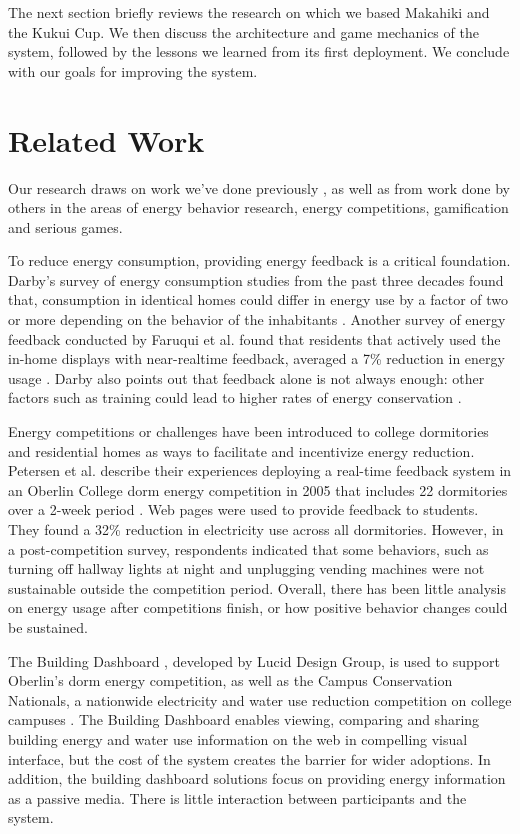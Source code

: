 \documentclass{acm_proc_article-sp}
\begin{document}
The next section briefly reviews the research on which we based Makahiki and
the Kukui Cup. We then discuss the architecture and game mechanics of the
system, followed by the lessons we learned from its first deployment. We
conclude with our goals for improving the system.

\section{Related Work}
Our research draws on work we've done previously
 \cite{csdl2-11-03,csdl2-10-07,csdl2-11-02}, as well as from
work done by others in the areas of energy behavior research, energy 
competitions, gamification and serious games. 

To reduce energy consumption, providing energy feedback is a critical
foundation. Darby's survey of energy consumption studies from the past three
decades found  that, consumption in identical homes could differ in energy use
by a factor of two or more depending on the behavior of the inhabitants
\cite{darby-review-2006}. Another survey of energy feedback conducted by
Faruqui et al. found that residents that actively used the in-home displays
with near-realtime feedback, averaged a 7\% reduction in energy usage
\cite{Faruqui09}. Darby also points out that feedback alone is not always
enough: other factors such as training could lead to higher rates of energy
conservation \cite{darby-2000-making-it-obvious}.

Energy competitions or challenges have been introduced to college dormitories
and residential homes as ways to facilitate and incentivize energy reduction.
Petersen et al. describe their experiences deploying a real-time feedback
system in an Oberlin College dorm energy competition in 2005 that includes 22
dormitories over a 2-week period \cite{petersen-dorm-energy-reduction}. Web
pages were used to provide feedback to students. They found a 32\% reduction in
electricity use across all dormitories. However, in a post-competition survey,
respondents indicated that some behaviors, such as turning off hallway lights
at night and unplugging vending machines were not sustainable outside the
competition period.  Overall, there has been little analysis on energy usage
after competitions finish, or how positive behavior changes could be sustained.

The Building Dashboard \cite{building-dashboard}, developed by Lucid Design 
Group, is used to support Oberlin's dorm energy competition,
as well as the Campus Conservation Nationals, a nationwide electricity and 
water use reduction competition on college campuses \cite{competetoreduce}. 
The Building Dashboard enables viewing, comparing and sharing building energy
and water use information on the web in compelling visual interface, but the 
cost of the system creates the barrier for wider adoptions. In addition, the 
building dashboard solutions focus on providing energy information as 
a passive media. There is little interaction between participants and the system.
\end{document}
